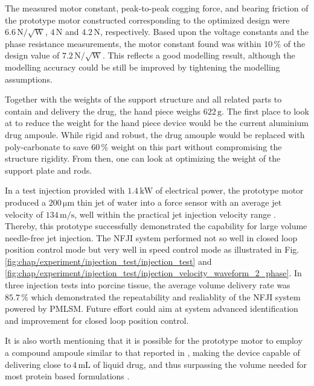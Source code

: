             
            The measured motor constant, peak-to-peak cogging force, and bearing friction of the prototype motor constructed corresponding to the optimized design were $6.6\,\mathrm{N/\sqrt{W}}$, $4\,\mathrm{N}$ and $4.2\,\mathrm{N}$, respectively. Based upon the voltage constants and the phase resistance measurements, the motor constant found was within $10\,\%$ of the design value of $7.2\,\mathrm{N/ \sqrt{ \mathrm{W}}}$. This reflects a good modelling result, although the modelling accuracy could be still be improved by tightening the modelling assumptions. 
            
            
            Together with the weights of the support structure and all related parts to contain and delivery the drug, the hand piece weighs $622\,\mathrm{g}$. The first place to look at to reduce the weight for the hand piece device would be the current aluminium drug ampoule. While rigid and robust, the drug amouple would be replaced with  poly-carbonate to save $60\,\%$ weight on this part without compromising the structure rigidity. From then, one can look at optimizing the weight of the support plate and rods. 
            
            
            In a test injection provided with $1.4\,\mathrm{kW}$ of electrical power, the prototype motor produced a $200\,\mathrm{\mu m}$ thin jet of water into a force sensor with an average jet velocity of $134\,\mathrm{m/s}$, well within the practical jet injection velocity range \cite{mitragotri2006}. Thereby, this prototype successfully demonstrated the capability for large volume needle-free jet injection. The \acs{NFJI} system performed not so well in closed loop position control mode but very well in speed control mode as illustrated in Fig.\,\ref{fig:chap/experiment/injection_test/injection_test} and \ref{fig:chap/experiment/injection_test/injection_velocity_waveform_2_phase}. In three injection tests into porcine tissue, the average volume delivery rate was $85.7\,\%$ which demonstrated the repeatability and realiablity of the \acs{NFJI} system powered by \acs{PMLSM}. Future effort could aim at system advanced identification and improvement for closed loop position control. 
            
            
            It is also worth mentioning that it is possible for the prototype motor to employ a compound ampoule similar to that reported in \cite{Ruddy2015a,McKeage2018}, making the device capable of delivering close to\,$4\,\mathrm{mL}$ of liquid drug, and thus surpassing the volume needed for most protein based formulations \cite{Hogan2015}.